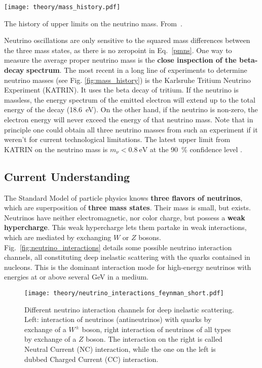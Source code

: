 \begin{marginfigure}
    \texttt{[image: theory/mass\_history.pdf]}
    \caption[Neutrino mass upper limit history]{The history of upper limits on the neutrino mass. From~\cite{Aker2022}.}
\end{marginfigure}

Neutrino oscillations are only sensitive to the squared mass differences between the three mass states, as there is no zeropoint in Eq.~\ref{pmns}. One way to measure the average proper neutrino mass is the \textbf{close inspection of the beta-decay} \textbf{spectrum}. The most recent in a long line of experiments to determine neutrino masses (see Fig. \ref{fig:mass_history}) is the Karlsruhe Tritium Neutrino Experiment (KATRIN). It uses the beta decay of tritium. If the neutrino is massless, the energy spectrum of the emitted electron will extend up to the total energy of the decay (\SI{18.6}{\eV}). On the other hand, if the neutrino is non-zero, the electron energy will never exceed the energy of that neutrino mass. Note that in principle one could obtain all three neutrino masses from such an experiment if it weren't for current technological limitations. The latest upper limit from KATRIN on the neutrino mass is $m_\nu < \SI{0.8}{\eV}$ at the \SI{90}{\percent} confidence level .


\subsection{Current Understanding}\label{neutrinos_current}
The Standard Model of particle physics knows \textbf{three flavors of neutrinos}, which are superposition of \textbf{three mass states}. Their mass is small, but exists. Neutrinos have neither electromagnetic, nor color charge, but possess a \textbf{weak hypercharge}. This weak hypercharge lets them partake in weak interactions, which are mediated by exchanging $W$ or $Z$ bosons. Fig.~\ref{fig:neutrino_interactions} details some possible neutrino interaction channels, all constituting deep inelastic scattering with the quarks contained in nucleons. This is the dominant interaction mode for high-energy neutrinos with energies at or above several \unit{\giga\eV} in a medium.

\begin{figure}[htb]
    \texttt{[image: theory/neutrino\_interactions\_feynman\_short.pdf]}
    \caption[Neutrino interactions]{Different neutrino interaction channels for deep inelastic scattering. Left: interaction of neutrinos (antineutrinos) with quarks by exchange of a $W^{\pm}$ boson, right interaction of neutrinos of all types by exchange of a $Z$ boson. The interaction on the right is called Neutral Current (NC) interaction, while the one on the left is dubbed Charged Current (CC) interaction.}
\end{figure}

